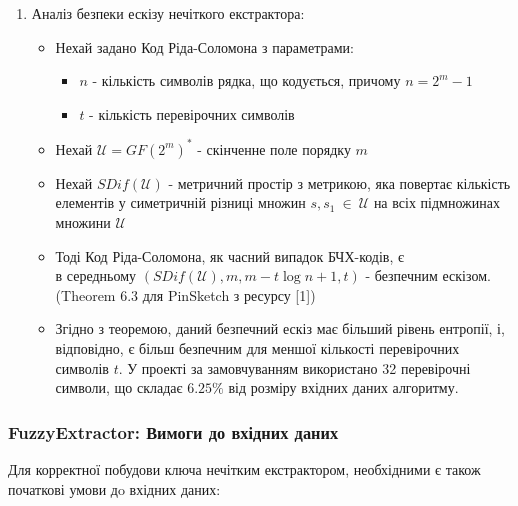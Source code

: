 \documentclass[11pt]{article}
\providecommand{\tightlist}{%
      \setlength{\itemsep}{0pt}\setlength{\parskip}{0pt}}
\begin{document}
    \begin{enumerate}
\def\labelenumi{\arabic{enumi}.}
\setcounter{enumi}{2}
\tightlist
\item
  Аналіз безпеки ескізу нечіткого екстрактора:

  \begin{itemize}
  \tightlist
  \item
    Нехай задано Код Ріда-Соломона з параметрами:

    \begin{itemize}
    \tightlist
    \item
      \(n\) - кількість символів рядка, що кодується, причому
      \(n = 2^m-1\)
    \item
      \(t\) - кількість перевірочних символів
    \end{itemize}
  \item
    Нехай \(\mathscr{U} = GF(2^m)^*\) - скінченне поле порядку \(m\)
  \item
    Нехай \(SDif(\mathscr{U})\) - метричний простір з метрикою, яка
    повертає кількість елементів у симетричній різниці множин
    \(s,s_1~\in~\mathscr{U}\) на всіх підмножинах множини
    \(\mathscr{U}\)
  \item
    Тоді Код Ріда-Соломона, як часний випадок БЧХ-кодів, є\\
    в середньому \((SDif(\mathscr{U}),m,m-t\log{n+1},t)\) - безпечним
    ескізом. (Theorem 6.3 для PinSketch з ресурсу [1])
  \item
    Згідно з теоремою, даний безпечний ескіз має більший рівень
    ентропії, і, відповідно, є більш безпечним для меншої кількості
    перевірочних символів \(t\). У проекті за замовчуванням використано
    32 перевірочні символи, що складає \(6.25\%\) від розміру вхідних
    даних алгоритму.
  \end{itemize}
\end{enumerate}

    \hypertarget{fuzzyextractor-ux432ux438ux43cux43eux433ux438-ux434ux43e-ux432ux445ux456ux434ux43dux438ux445-ux434ux430ux43dux438ux445}{%
\subsubsection{FuzzyExtractor: Вимоги до вхідних
даних}\label{fuzzyextractor-ux432ux438ux43cux43eux433ux438-ux434ux43e-ux432ux445ux456ux434ux43dux438ux445-ux434ux430ux43dux438ux445}}

Для корректної побудови ключа нечітким екстрактором, необхідними є також
початкові умови дo вхідних даних:
\end{document}

